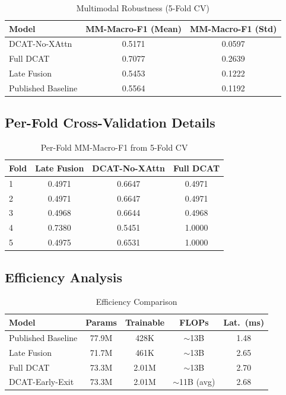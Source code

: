 \documentclass[conference]{IEEEtran}
\begin{document}
\begin{table}[htbp]
\centering
\renewcommand{\arraystretch}{1.2}
\caption{Multimodal Robustness (5-Fold CV)}
\label{tab:6}
\begin{tabular}{lcc}
\toprule
Model & MM-Macro-F1 (Mean) & MM-Macro-F1 (Std) \\
\midrule
DCAT-No-XAttn & 0.5171 & 0.0597 \\
Full DCAT & 0.7077 & 0.2639 \\
Late Fusion & 0.5453 & 0.1222 \\
Published Baseline & 0.5564 & 0.1192 \\
\bottomrule
\end{tabular}
\end{table}

\subsection{Per-Fold Cross-Validation Details}

\begin{table}[htbp]
\centering
\renewcommand{\arraystretch}{1.2}
\caption{Per-Fold MM-Macro-F1 from 5-Fold CV}
\label{tab:7}
\begin{tabular}{lccc}
\toprule
Fold & Late Fusion & DCAT-No-XAttn & Full DCAT \\
\midrule
1 & 0.4971 & 0.6647 & 0.4971 \\
2 & 0.4971 & 0.6647 & 0.4971 \\
3 & 0.4968 & 0.6644 & 0.4968 \\
4 & 0.7380 & 0.5451 & 1.0000 \\
5 & 0.4975 & 0.6531 & 1.0000 \\
\bottomrule
\end{tabular}
\end{table}

\subsection{Efficiency Analysis}

\begin{table}[htbp]
\centering
\renewcommand{\arraystretch}{1.2}
\caption{Efficiency Comparison}
\label{tab:8}
\begin{tabular}{lcccc}
\toprule
Model & Params & Trainable & FLOPs & Lat.\ (ms) \\
\midrule
Published Baseline & 77.9M & 428K & $\sim$13B & 1.48 \\
Late Fusion & 71.7M & 461K & $\sim$13B & 2.65 \\
Full DCAT & 73.3M & 2.01M & $\sim$13B & 2.70 \\
DCAT-Early-Exit & 73.3M & 2.01M & $\sim$11B (avg) & 2.68 \\
\bottomrule
\end{tabular}
\end{table}
\end{document}
